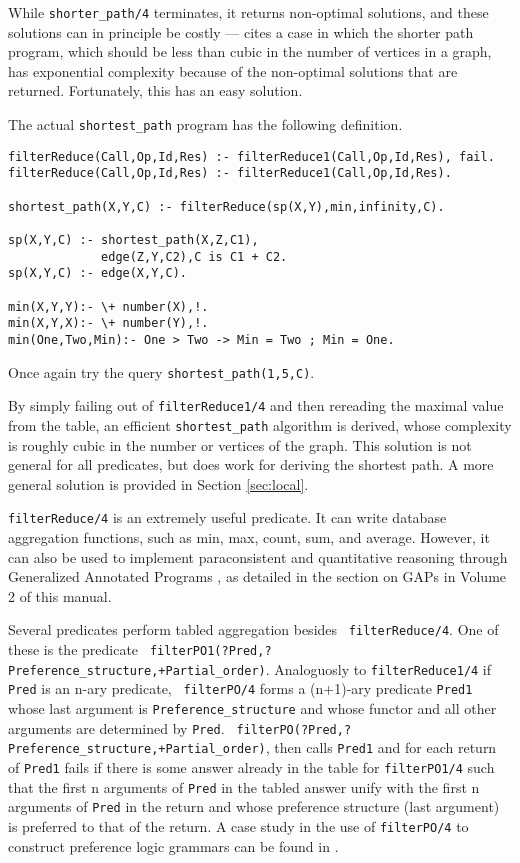 While {\tt shorter\_path/4} terminates, it returns non-optimal
solutions, and these solutions can in principle be costly ---
\cite{JFLP-Scheduling} cites a case in which the shorter path program,
which should be less than cubic in the number of vertices in a graph,
has exponential complexity because of the non-optimal solutions that
are returned.  Fortunately, this has an easy solution.

\begin{exercise}
The actual {\tt shortest\_path} program has the following definition.
\begin{center}
\begin{minipage}{3.8in}
\begin{verbatim}
filterReduce(Call,Op,Id,Res) :- filterReduce1(Call,Op,Id,Res), fail.
filterReduce(Call,Op,Id,Res) :- filterReduce1(Call,Op,Id,Res).

shortest_path(X,Y,C) :- filterReduce(sp(X,Y),min,infinity,C).

sp(X,Y,C) :- shortest_path(X,Z,C1),
             edge(Z,Y,C2),C is C1 + C2.
sp(X,Y,C) :- edge(X,Y,C).

min(X,Y,Y):- \+ number(X),!.
min(X,Y,X):- \+ number(Y),!.
min(One,Two,Min):- One > Two -> Min = Two ; Min = One.
\end{verbatim}						       
\end{minipage}
\end{center}
Once again try the query {\tt shortest\_path(1,5,C)}.
\end{exercise}

By simply failing out of {\tt filterReduce1/4} and then rereading the
maximal value from the table, an efficient {\tt shortest\_path}
algorithm is derived, whose complexity is roughly cubic in the number
or vertices of the graph.  This solution is not general for all
predicates, but does work for deriving the shortest path.  A more
general solution is provided in Section \ref{sec:local}.

{\tt filterReduce/4} is an extremely useful predicate.  It can write
database aggregation functions, such as min, max, count, sum, and
average.  However, it can also be used to implement paraconsistent and
quantitative reasoning through Generalized Annotated Programs
\cite{KiSu92}, as detailed in the section on GAPs in Volume 2 of this
manual.

Several predicates perform tabled aggregation besides {\tt
filterReduce/4}.  One of these is the predicate {\tt
filterPO1(?Pred,?Preference\_structure,+Partial\_order)}.  Analoguosly
to {\tt filterReduce1/4} if {\tt Pred} is an n-ary predicate, {\tt
filterPO/4} forms a (n+1)-ary predicate {\tt Pred1} whose last
argument is {\tt Preference\_structure} and whose functor and all
other arguments are determined by {\tt Pred}.  {\tt
filterPO(?Pred,?Preference\_structure,+Partial\_order)}, then calls
{\tt Pred1} and for each return of {\tt Pred1} fails if there is some
answer already in the table for {\tt filterPO1/4} such that the first
n arguments of {\tt Pred} in the tabled answer unify with the first n
arguments of {\tt Pred} in the return and whose preference structure
(last argument) is preferred to that of the return.  A case study in
the use of {\tt filterPO/4} to construct preference logic grammars can
be found in \cite{CuSW99}.

